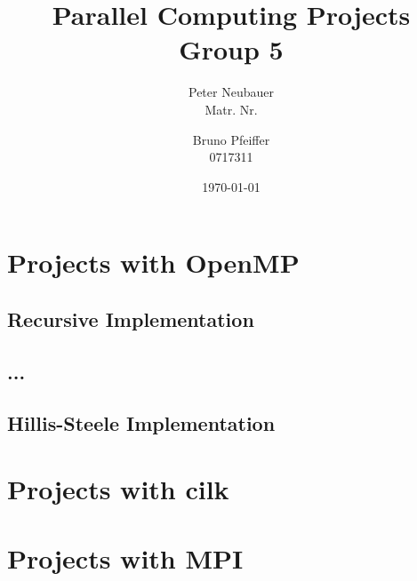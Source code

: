 \documentclass[11pt, draft]{article}
\begin{document}
\title{Parallel Computing Projects\\ Group 5}
\author{Peter Neubauer\\ Matr. Nr. \and Bruno Pfeiffer \\ 0717311}
\date{\today}
\maketitle
\newpage
\tableofcontents

\section[OpenMP]{Projects with OpenMP}

\subsection{Recursive Implementation}

\subsection{...}

\subsection{Hillis-Steele Implementation}

\section[cilk]{Projects with cilk}

\section[MPI]{Projects with MPI}
\end{document}
